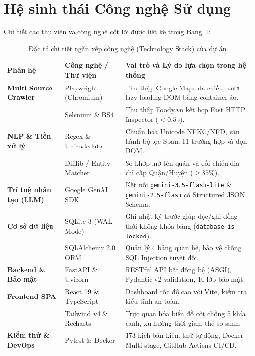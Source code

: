 \documentclass[12pt, a4paper, oneside]{book}
\begin{document}
\section{Hệ sinh thái Công nghệ Sử dụng}
Chi tiết các thư viện và công nghệ cốt lõi được liệt kê trong Bảng~\ref{tab:tech_stack}:

\begin{table}[H]
\centering
\caption{Đặc tả chi tiết ngăn xếp công nghệ (Technology Stack) của dự án}
\label{tab:tech_stack}
\vspace{0.15cm}
\footnotesize
\begin{tabularx}{\textwidth}{l l X}
\toprule
\rowcolor{blue!8}
\textbf{Phân hệ} & \textbf{Công nghệ / Thư viện} & \textbf{Vai trò và Lý do lựa chọn trong hệ thống} \\
\midrule
\textbf{Multi-Source Crawler} & Playwright (Chromium) & Thu thập Google Maps đa chiều, vượt lazy-loading DOM bằng container ảo. \\
 & Selenium \& BS4 & Thu thập Foody.vn kết hợp Fast HTTP Inspector ($<0.5\,\mathrm{s}$). \\
\midrule
\textbf{NLP \& Tiền xử lý} & Regex \& Unicodedata & Chuẩn hóa Unicode NFKC/NFD, vận hành bộ lọc Spam 11 trường hợp và dọn DOM. \\
 & Difflib / Entity Matcher & So khớp mờ tên quán và đối chiếu địa chỉ cấp Quận/Huyện ($\ge 85\%$). \\
\midrule
\textbf{Trí tuệ nhân tạo (LLM)} & Google GenAI SDK~\cite{google2025} & Kết nối \texttt{gemini-3.5-flash-lite} \& \texttt{gemini-2.5-flash} có Structured JSON Schema. \\
\midrule
\textbf{Cơ sở dữ liệu} & SQLite 3 (WAL Mode)~\cite{hipp2024} & Ghi nhật ký trước giúp đọc/ghi đồng thời không khóa bảng (\texttt{database is locked}). \\
 & SQLAlchemy 2.0 ORM & Quản lý 4 bảng quan hệ, bảo vệ chống SQL Injection tuyệt đối. \\
\midrule
\textbf{Backend \& Bảo mật} & FastAPI \& Uvicorn~\cite{ramirez2025} & RESTful API bất đồng bộ (ASGI), Pydantic v2 validation, 10 lớp bảo mật. \\
\midrule
\textbf{Frontend SPA} & React 19 \& TypeScript & Dashboard tốc độ cao với Vite, kiểm tra kiểu tĩnh an toàn. \\
 & Tailwind v4 \& Recharts & Trực quan hóa biểu đồ cột chồng 5 khía cạnh, xu hướng thời gian, thẻ so sánh. \\
\midrule
\textbf{Kiểm thử \& DevOps} & Pytest \& Docker & 173 kịch bản kiểm thử tự động, Docker Multi-stage, GitHub Actions CI/CD. \\
\bottomrule
\end{tabularx}
\end{table}
\end{document}
